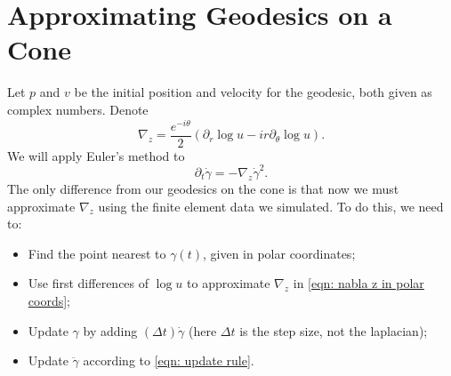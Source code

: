 \documentclass{article}
\begin{document}
\pagebreak
\section*{Approximating Geodesics on a Cone}
Let $p$ and $v$ be the initial position and velocity for the geodesic, both given as complex numbers.  Denote
\begin{equation}\label{eqn: nabla z in polar coords}
    \nabla_z = \frac{e^{-i\theta}}{2}(\partial_r\log u-ir\partial_\theta\log u).
\end{equation}
We will apply Euler's method to
\begin{equation}\label{eqn: update rule}
    \partial_t\dot\gamma=-\nabla_z\dot\gamma^2.
\end{equation}
The only difference from our geodesics on the cone is that now we must approximate $\nabla_z$ using the finite element data we simulated.  To do this, we need to:
\begin{itemize}
    \item Find the point nearest to $\gamma(t)$, given in polar coordinates;
    \item Use first differences of $\log u$ to approximate $\nabla_z$ in \eqref{eqn: nabla z in polar coords};
    \item Update $\gamma$ by adding $(\Delta t)\dot\gamma$ (here $\Delta t$ is the step size, not the laplacian);
    \item Update $\ddot\gamma$ according to \eqref{eqn: update rule}.
\end{itemize}

\vspace{1em}
\begin{center}
\end{center}
\end{document}
